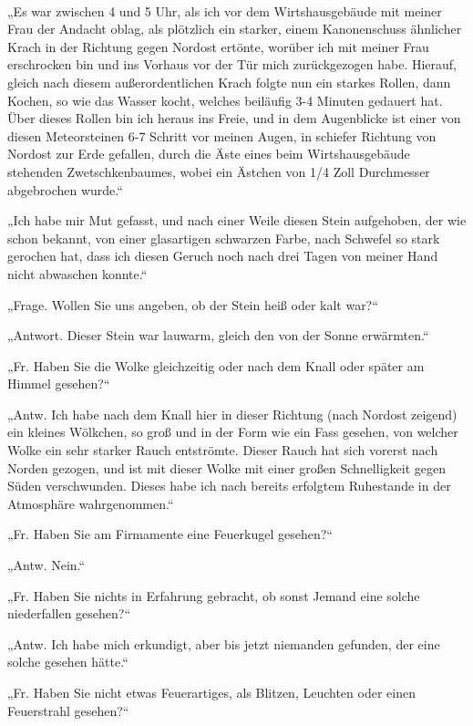\documentclass[a4paper, 11pt, oneside, german]{article}
\begin{document}
\paragraph{}
„Es war zwischen 4 und 5 Uhr, als ich vor dem Wirtshausgebäude mit meiner Frau der Andacht oblag, als plötzlich ein starker, einem Kanonenschuss ähnlicher Krach in der Richtung gegen Nordost ertönte, worüber ich mit meiner Frau erschrocken bin und ins Vorhaus vor der Tür mich zurückgezogen habe. Hierauf, gleich nach diesem außerordentlichen Krach folgte nun ein starkes Rollen, dann Kochen, so wie das Wasser kocht, welches beiläufig 3-4 Minuten gedauert hat. Über dieses Rollen bin ich heraus ins Freie, und in dem Augenblicke ist einer von diesen Meteorsteinen 6-7 Schritt vor meinen Augen, in schiefer Richtung von Nordost zur Erde gefallen, durch die Äste eines beim Wirtshausgebäude stehenden Zwetschkenbaumes, wobei ein Ästchen von 1/4 Zoll Durchmesser abgebrochen wurde.“

„Ich habe mir Mut gefasst, und nach einer Weile diesen Stein aufgehoben, der wie schon bekannt, von einer glasartigen schwarzen Farbe, nach Schwefel so stark gerochen hat, dass ich diesen Geruch noch nach drei Tagen von meiner Hand nicht abwaschen konnte.“

„Frage. Wollen Sie uns angeben, ob der Stein heiß oder kalt war?“

„Antwort. Dieser Stein war lauwarm, gleich den von der Sonne erwärmten.“

„Fr. Haben Sie die Wolke gleichzeitig oder nach dem Knall oder später am Himmel gesehen?“

„Antw. Ich habe nach dem Knall hier in dieser Richtung (nach Nordost zeigend) ein kleines Wölkchen, so groß und in der Form wie ein Fass gesehen, von welcher Wolke ein sehr starker Rauch entströmte. Dieser Rauch hat sich vorerst nach Norden gezogen, und ist mit dieser Wolke mit einer großen Schnelligkeit gegen Süden verschwunden. Dieses habe ich nach bereits erfolgtem Ruhestande in der Atmosphäre wahrgenommen.“

„Fr. Haben Sie am Firmamente eine Feuerkugel gesehen?“

„Antw. Nein.“

„Fr. Haben Sie nichts in Erfahrung gebracht, ob sonst Jemand eine solche niederfallen gesehen?“

„Antw. Ich habe mich erkundigt, aber bis jetzt niemanden gefunden, der eine solche gesehen hätte.“

„Fr. Haben Sie nicht etwas Feuerartiges, als Blitzen, Leuchten oder einen Feuerstrahl gesehen?“
\end{document}

